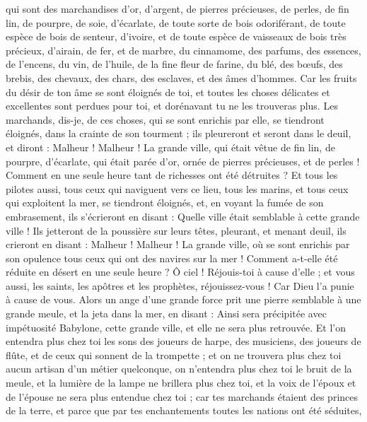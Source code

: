 \begin{multicols}{2}
qui sont des marchandises d'or, d'argent, de pierres précieuses, de perles, de fin lin, de pourpre, de soie, d'écarlate, de toute sorte de bois odoriférant, de toute espèce de bois de senteur, d'ivoire, et de toute espèce de vaisseaux de bois très précieux, d'airain, de fer, et de marbre,
du cinnamome, des parfums, des essences, de l'encens, du vin, de l'huile, de la fine fleur de farine, du blé, des bœufs, des brebis, des chevaux, des chars, des esclaves, et des âmes d'hommes.
Car les fruits du désir de ton âme se sont éloignés de toi, et toutes les choses délicates et excellentes sont perdues pour toi, et dorénavant tu ne les trouveras plus.
Les marchands, dis-je, de ces choses, qui se sont enrichis par elle, se tiendront éloignés, dans la crainte de son tourment ; ils pleureront et seront dans le deuil,
et diront : Malheur ! Malheur ! La grande ville, qui était vêtue de fin lin, de pourpre, d'écarlate, qui était parée d'or, ornée de pierres précieuses, et de perles ! Comment en une seule heure tant de richesses ont été détruites ?
Et tous les pilotes aussi, tous ceux qui naviguent vers ce lieu, tous les marins, et tous ceux qui exploitent la mer, se tiendront éloignés,
et, en voyant la fumée de son embrasement, ils s'écrieront en disant : Quelle ville était semblable à cette grande ville !
Ils jetteront de la poussière sur leurs têtes, pleurant, et menant deuil, ils crieront en disant : Malheur ! Malheur ! La grande ville, où se sont enrichis par son opulence tous ceux qui ont des navires sur la mer ! Comment a-t-elle été réduite en désert en une seule heure ?
Ô ciel ! Réjouis-toi à cause d'elle ; et vous aussi, les saints, les apôtres et les prophètes, réjouissez-vous ! Car Dieu l'a punie à cause de vous.
Alors un ange d'une grande force prit une pierre semblable à une grande meule, et la jeta dans la mer, en disant : Ainsi sera précipitée avec impétuosité Babylone, cette grande ville, et elle ne sera plus retrouvée.
Et l'on entendra plus chez toi les sons des joueurs de harpe, des musiciens, des joueurs de flûte, et de ceux qui sonnent de la trompette ; et on ne trouvera plus chez toi aucun artisan d'un métier quelconque, on n'entendra plus chez toi le bruit de la meule,
et la lumière de la lampe ne brillera plus chez toi, et la voix de l'époux et de l'épouse ne sera plus entendue chez toi ; car tes marchands étaient des princes de la terre, et parce que par tes enchantements toutes les nations ont été séduites,

\end{multicols}
